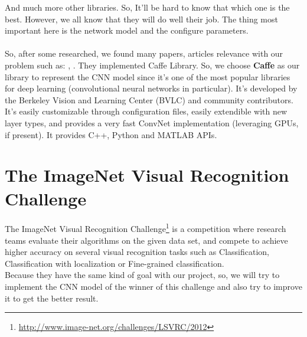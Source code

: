 \documentclass[hidelinks,12pt,a4paper]{report}
\begin{document}
And much more other libraries. So, It’ll be hard to know that which one is the best. However, we all know that they will do well their job. The thing most important here is the network model and the configure parameters. \\
\\
So, after some researched, we found many papers, articles relevance with our problem such as: \cite{placesdatabase}, \cite{landclassification}. They implemented Caffe Library. So, we choose \textbf{Caffe} as our library to represent the CNN model since it’s one of the most popular libraries for deep learning (convolutional neural networks in particular). It's developed by the Berkeley Vision and Learning Center (BVLC) and
community contributors. It’s easily customizable through configuration files, easily extendible with new layer types,
and provides a very fast ConvNet implementation (leveraging GPUs, if present). It provides C++, Python and MATLAB APIs.

\section{The ImageNet Visual Recognition Challenge}

The ImageNet Visual Recognition Challenge\footnote{\url{http://www.image-net.org/challenges/LSVRC/2012}} is a competition where research teams evaluate their algorithms on the given data set, and compete to achieve higher accuracy on several visual recognition tasks such as Classification, Classification with localization or Fine-grained classification. \\
Because they have the same kind of goal with our project, so, we will try to implement the CNN model of the winner of this challenge and also try to improve it to get the better result.



\end{document}
